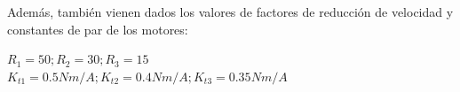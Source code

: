 \documentclass[a4paper,twoside]{article}
\begin{document}
	Además, también vienen dados los valores de factores de reducción de velocidad y constantes de par de los motores:
	\begin{center}
		$R_1 = 50; R_2 = 30; R_3 = 15$\\\vspace{0.5 cm}
		$K_{t1} = 0.5 Nm/A; K_{t2} = 0.4 Nm/A; K_{t3} = 0.35 Nm/A$
	\end{center}





\end{document}
